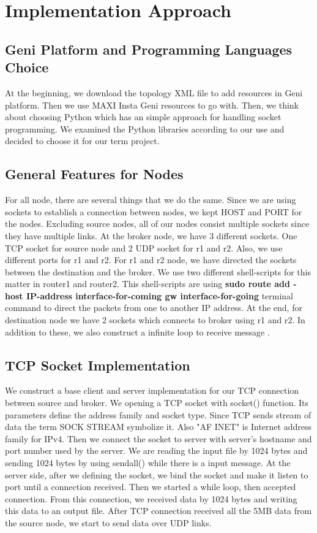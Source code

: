 \documentclass[conference]{IEEEtran}
\begin{document}
\section{Implementation Approach}

\subsection{Geni Platform and Programming Languages Choice}

At the beginning, we download the topology XML file to add resources in Geni platform. Then we use MAXI Insta Geni resources to go with. Then, we think about choosing Python which has an simple approach for handling socket programming. We examined the Python libraries according to our use and decided to choose it for our term project.
\subsection{General Features for Nodes}

For all node, there are several things that we do the same. Since we are using sockets to establish a connection between nodes, we kept HOST and PORT for the nodes. Excluding source nodes, all of our nodes consist multiple sockets since they have multiple links. At the broker node, we have 3 different sockets. One TCP socket for source node and 2 UDP socket for r1 and r2. Also, we use different ports for r1 and r2. For r1 and r2 node, we have directed the sockets between the destination and the broker. We use two different shell-scripts for this matter in router1 and router2. This shell-scripts are using \textbf{sudo route add -host IP-address interface-for-coming gw interface-for-going} terminal command to direct the packets from one to another IP address. At the end, for destination node we have 2 sockets which connects to broker using r1 and r2. In addition to these, we also construct a infinite loop to receive message .
\subsection{TCP Socket Implementation}

We construct a base client and server implementation for our TCP connection between source and broker. We opening a TCP socket with socket() function. Its parameters define the address family and socket type. Since TCP sends stream of data the term SOCK STREAM symbolize it. Also "AF INET" is Internet address family for IPv4. Then we connect the socket to server with server's hostname and port number used by the server. We are reading the input file by 1024 bytes and sending 1024 bytes by using sendall() while there is a input message. At the server side, after we defining the socket, we bind the socket and make it listen to port until a connection received. Then we started a while loop, then accepted connection. From this connection, we received data by 1024 bytes and writing this data to an output file. After TCP connection received all the 5MB data from the source node, we start to send data over UDP links.
\end{document}
